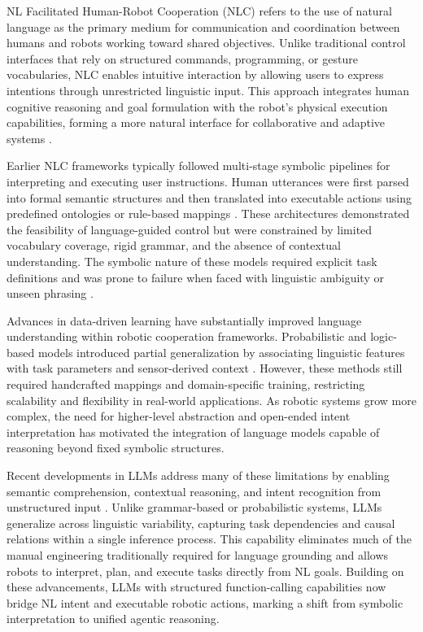 
NL Facilitated Human-Robot Cooperation (NLC) refers to the use of natural language as the primary medium for communication and coordination between humans and robots working toward shared objectives. Unlike traditional control interfaces that rely on structured commands, programming, or gesture vocabularies, NLC enables intuitive interaction by allowing users to express intentions through unrestricted linguistic input. This approach integrates human cognitive reasoning and goal formulation with the robot’s physical execution capabilities, forming a more natural interface for collaborative and adaptive systems \cite{doi:10.1177/1729881419851402}. 

Earlier NLC frameworks typically followed multi-stage symbolic pipelines for interpreting and executing user instructions. Human utterances were first parsed into formal semantic structures and then translated into executable actions using predefined ontologies or rule-based mappings \cite{LAURIA2002171}. These architectures demonstrated the feasibility of language-guided control but were constrained by limited vocabulary coverage, rigid grammar, and the absence of contextual understanding. The symbolic nature of these models required explicit task definitions and was prone to failure when faced with linguistic ambiguity or unseen phrasing \cite{doi:10.1177/1729881419851402}.

Advances in data-driven learning have substantially improved language understanding within robotic cooperation frameworks. Probabilistic and logic-based models introduced partial generalization by associating linguistic features with task parameters and sensor-derived context \cite{doi:10.1177/1729881419851402}. However, these methods still required handcrafted mappings and domain-specific training, restricting scalability and flexibility in real-world applications. As robotic systems grow more complex, the need for higher-level abstraction and open-ended intent interpretation has motivated the integration of language models capable of reasoning beyond fixed symbolic structures.

Recent developments in LLMs address many of these limitations by enabling semantic comprehension, contextual reasoning, and intent recognition from unstructured input \cite{wang2025function}. Unlike grammar-based or probabilistic systems, LLMs generalize across linguistic variability, capturing task dependencies and causal relations within a single inference process. This capability eliminates much of the manual engineering traditionally required for language grounding and allows robots to interpret, plan, and execute tasks directly from NL goals. Building on these advancements, LLMs with structured function-calling capabilities now bridge NL intent and executable robotic actions, marking a shift from symbolic interpretation to unified agentic reasoning.

